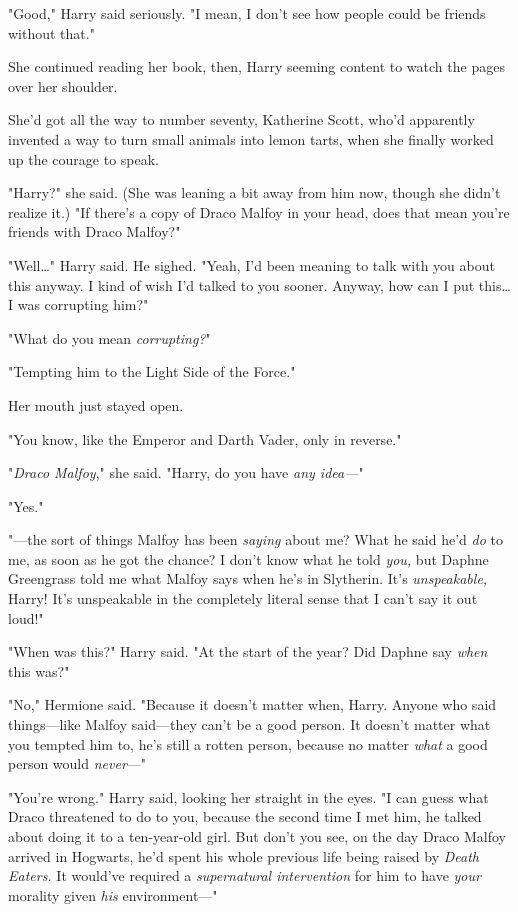 "Good," Harry said seriously. "I mean, I don't see how people could be friends
without that."

She continued reading her book, then, Harry seeming content to watch the pages
over her shoulder.

She'd got all the way to number seventy, Katherine Scott, who'd apparently
invented a way to turn small animals into lemon tarts, when she finally worked
up the courage to speak.

"Harry?" she said. (She was leaning a bit away from him now, though she didn't
realize it.) "If there's a copy of Draco Malfoy in your head, does that mean
you're friends with Draco Malfoy?"

"Well{\ldots}" Harry said. He sighed. "Yeah, I'd been meaning to talk with you
about this anyway. I kind of wish I'd talked to you sooner. Anyway, how can I
put this{\ldots} I was corrupting him?"

"What do you mean \emph{corrupting?}"

"Tempting him to the Light Side of the Force."

Her mouth just stayed open.

"You know, like the Emperor and Darth Vader, only in reverse."

"\emph{Draco Malfoy}," she said. "Harry, do you have \emph{any idea---}"

"Yes."

"---the sort of things Malfoy has been \emph{saying} about me? What he said
he'd \emph{do} to me, as soon as he got the chance? I don't know what he told
\emph{you,} but Daphne Greengrass told me what Malfoy says when he's in
Slytherin. It's \emph{unspeakable,} Harry! It's unspeakable in the completely
literal sense that I can't say it out loud!"

"When was this?" Harry said. "At the start of the year? Did Daphne say
\emph{when} this was?"

"No," Hermione said. "Because it doesn't matter when, Harry. Anyone who said
things---like Malfoy said---they can't be a good person. It doesn't matter what
you tempted him to, he's still a rotten person, because no matter \emph{what} a
good person would \emph{never}---"

"You're wrong." Harry said, looking her straight in the eyes. "I can guess what
Draco threatened to do to you, because the second time I met him, he talked
about doing it to a ten-year-old girl. But don't you see, on the day Draco
Malfoy arrived in Hogwarts, he'd spent his whole previous life being raised by
\emph{Death Eaters.} It would've required a \emph{supernatural intervention}
for him to have \emph{your} morality given \emph{his} environment---"

